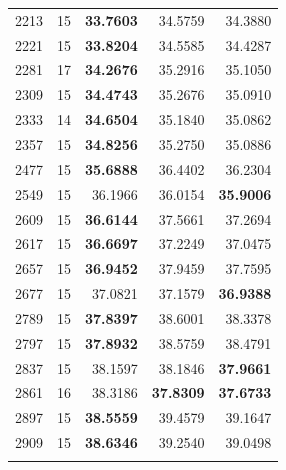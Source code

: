 \documentclass[]{spie}  %
\begin{document}
\begin{table}
{\begin{tabular}{rrrrr}
2213 & 15 & \textbf{33.7603} & 34.5759 & 34.3880 \\
2221 & 15 & \textbf{33.8204} & 34.5585 & 34.4287 \\
2281 & 17 & \textbf{34.2676} & 35.2916 & 35.1050 \\
2309 & 15 & \textbf{34.4743} & 35.2676 & 35.0910 \\
2333 & 14 & \textbf{34.6504} & 35.1840 & 35.0862 \\
2357 & 15 & \textbf{34.8256} & 35.2750 & 35.0886 \\
2477 & 15 & \textbf{35.6888} & 36.4402 & 36.2304 \\
2549 & 15 & 36.1966 & 36.0154 & \textbf{35.9006} \\
2609 & 15 & \textbf{36.6144} & 37.5661 & 37.2694 \\
2617 & 15 & \textbf{36.6697} & 37.2249 & 37.0475 \\
2657 & 15 & \textbf{36.9452} & 37.9459 & 37.7595 \\
2677 & 15 & 37.0821 & 37.1579 & \textbf{36.9388} \\
2789 & 15 & \textbf{37.8397} & 38.6001 & 38.3378 \\
2797 & 15 & \textbf{37.8932} & 38.5759 & 38.4791 \\
2837 & 15 & 38.1597 & 38.1846 & \textbf{37.9661} \\
2861 & 16 & 38.3186 & \textbf{37.8309} & \textbf{37.6733} \\
2897 & 15 & \textbf{38.5559} & 39.4579 & 39.1647 \\
2909 & 15 & \textbf{38.6346} & 39.2540 & 39.0498 \\
\phantom{2909} & \\
\end{tabular}
}
\end{table}
\end{document}

